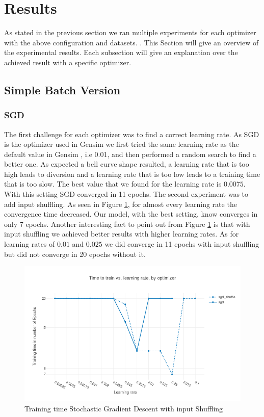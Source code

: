

\section{Results}\label{sec:results}
As stated in the previous section we ran multiple experiments for each optimizer with the above configuration and datasets. . This Section will  give an overview of the experimental results. Each subsection will give an explanation over the achieved result with a specific optimizer.

\subsection{Simple Batch Version}
\subsubsection{SGD}
The first challenge for each optimizer was to find a correct learning rate. As SGD is the optimizer used in Gensim \citep{gensim} we first tried the same learning rate as the default value in Gensim \citep{gensim}, i.e 0.01,  and then performed a random search to find a better one. As expected a bell curve shape resulted, a learning rate that is too high leads to diversion and a learning rate that is too low leads to a training time that is too slow. The best value that we found for the learning rate is $0.0075$. With this setting SGD converged in 11 epochs. The second experiment was to add input shuffling.
As seen in Figure \ref{fig:results_sgd}, for almost every learning rate the convergence time decreased. Our model, with the best setting, know converges in only 7 epochs. Another interesting fact to point out from Figure \ref{fig:results_sgd} is that with input shuffling we achieved better results with higher learning rates. As for learning rates of $0.01$ and $0.025$ we did converge in 11 epochs with input shuffling but did not converge in 20 epochs without it.

\begin{figure}[h]
\centering
\includegraphics[scale=0.3]{images/results_sgd_shuffle}
\caption{Training time Stochastic Gradient Descent with input Shuffling}
\label{fig:results_sgd}
\end{figure}
\iffalse 
